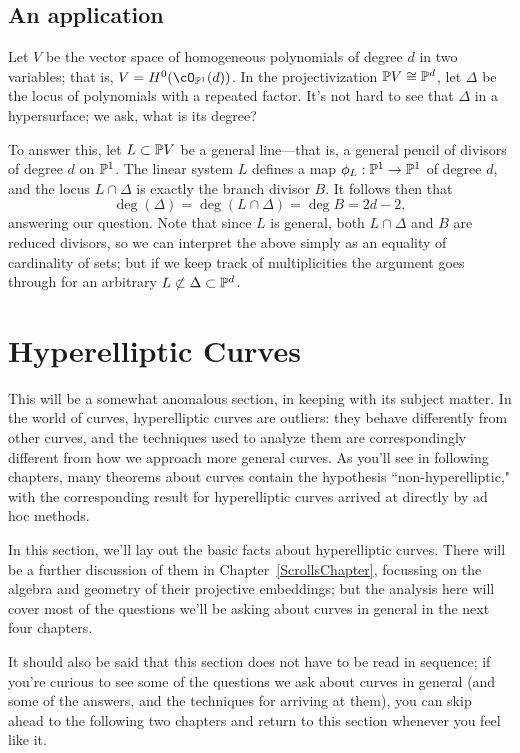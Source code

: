  \subsection{An application}
 
 Let $V$ be the vector space of homogeneous polynomials of degree $d$ in two variables; that is, $V = H^0(\cO_{\PP^1}(d))$. In the projectivization $\PP V \cong \PP^d$, let $\Delta$ be the locus of polynomials with a repeated factor. It's not hard to see that $\Delta$ in a hypersurface; we ask, what is its degree?
 
 To answer this, let $L \subset \PP V$ be a general line---that is, a general pencil of divisors of degree $d$ on $\PP^1$. The linear system $L$ defines a map $\phi_L : \PP^1 \to \PP^1$ of degree $d$, and the locus $L \cap \Delta$ is exactly the branch divisor $B$.
 It follows then that
 $$
 \deg(\Delta) = \deg(L \cap \Delta) = \deg B = 2d-2,
 $$
 answering our question. Note that since $L$ is general, both $L\cap \Delta$ and $B$ are reduced divisors, so we can interpret the above simply as an equality of cardinality of sets; but if we keep track of multiplicities the argument goes through for an arbitrary $L \not\subset \Delta \subset \PP^d$.
 
 \section{Hyperelliptic Curves}
 
 
 This will be a somewhat anomalous section, in keeping with its subject matter. In the world of curves, hyperelliptic curves are outliers: they behave differently from other curves, and the techniques used to analyze them are correspondingly different from how we approach more general curves. As you'll see in following chapters, many theorems about curves contain the hypothesis ``non-hyperelliptic," with the corresponding result for hyperelliptic curves arrived at directly by ad hoc methods.
 
 In this section, we'll lay out the basic facts about hyperelliptic curves. There will be a further discussion of them in Chapter~\ref{ScrollsChapter}, focussing on the algebra and geometry of their projective embeddings; but the analysis here will cover most of the questions we'll be asking about curves in general in the next four chapters. 
 
 It should also be said that this section does not have to be read in sequence; if you're curious to see some of the questions we ask about curves in general (and some of the answers, and the techniques for arriving at them), you can skip ahead to the following two chapters and return to this section whenever you feel like it.
 
